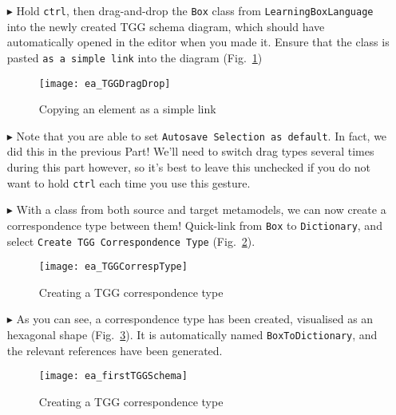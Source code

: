 \begin{itemize}
\item[$\blacktriangleright$] Hold \texttt{ctrl}, then drag-and-drop the \texttt{Box} class from \texttt{Learning\-Box\-Language} into the newly
created TGG schema diagram, which should have automatically opened in the editor when you made it. Ensure that the class is pasted \texttt{as a simple link} into the
diagram (Fig.~\ref{fig:TGGdragDrop})

\begin{figure}[htbp]
\begin{center}
  \texttt{[image: ea\_TGGDragDrop]}
  \caption{Copying an element as a simple link} 
  \label{fig:TGGdragDrop}
\end{center}
\end{figure}

\item[$\blacktriangleright$] Note that you are able to set \texttt{Autosave Selection as default}. In fact, we did this in the previous Part! We'll need to
switch drag types several times during this part however, so it's best to leave this unchecked if you do not want to hold \texttt{ctrl} each time you use this
gesture.

\item[$\blacktriangleright$] With a class from both source and target metamodels, we can now create a correspondence type between them! Quick-link from
\texttt{Box} to \texttt{Dictionary}, and select \texttt{Create TGG Corres\-pon\-dence Type} (Fig.~\ref{fig:create_correspondence}).

\newpage

\begin{figure}[htbp]
\begin{center}
  \texttt{[image: ea\_TGGCorrespType]}
  \caption{Creating a TGG correspondence type} 
  \label{fig:create_correspondence}
\end{center}
\end{figure}

\item[$\blacktriangleright$] As you can see, a correspondence type has been created, visualised as an hexagonal shape (Fig.~\ref{fig:ea_firstCorrType}). It is
automatically named \texttt{BoxToDiction\-ary}, and the relevant references have been generated.


\begin{figure}[htbp]
\begin{center}
  \texttt{[image: ea\_firstTGGSchema]}
  \caption{Creating a TGG correspondence type} 
  \label{fig:ea_firstCorrType}
\end{center}
\end{figure}


\end{itemize}
